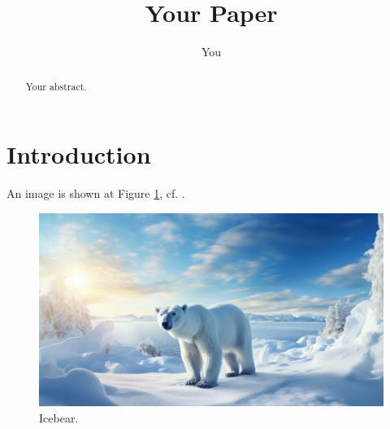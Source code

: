 \documentclass{article}
\title{Your Paper}
\author{You}
\begin{document}
\maketitle

\begin{abstract}
Your abstract.
\end{abstract}

\section{Introduction}

An image is shown at Figure \ref{fig:Icebear}, cf. \cite{icebear}.

\begin{figure}[h!]
\centering
\includegraphics[width=\linewidth]{images/icebear}
\caption{\label{fig:Icebear} Icebear.}
\end{figure}



\end{document}
